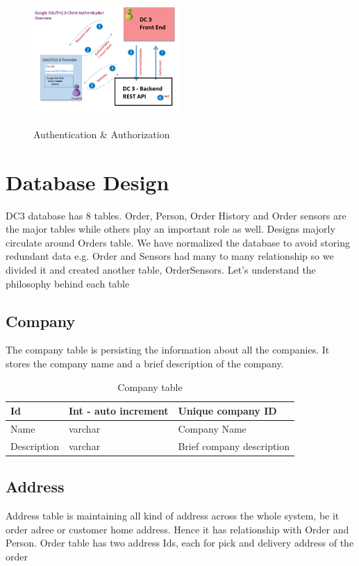 \begin{figure}[!ht]
	\centering
	\includegraphics[width=0.5\textwidth]{images/GoogleAuth.jpeg}\\
	\caption{Authentication \& Authorization}
	\label{fig:Authentication and Authorization}
\end{figure}



\section{Database Design}
DC3 database has 8 tables. Order, Person, Order History and Order sensors are the major tables while others play an important role as well.  Designs majorly circulate around Orders table. We have normalized the database to avoid storing redundant data e.g. Order and Sensors had many to many relationship so we divided it and created another table, OrderSensors. Let’s understand the philosophy behind each table


\subsection{Company}
The company table is persisting the information about all the companies. It stores the company name and a brief description of the company. 

\begin{table}[!ht]
	\centering
	\begin{tabular}{ |l|l|l| }
		\hline
		Id & Int - auto increment & Unique company ID \\
		\hline
		Name & varchar & Company Name \\
		\hline
		Description & varchar & Brief company description \\
		\hline
	\end{tabular}
	\caption{Company table}
\end{table}



\subsection{Address}
Address table is maintaining all kind of address across the whole system, be it order adree or customer home address. Hence it has relationship with Order and Person. Order table has two address Ids, each for pick and delivery address of the order



